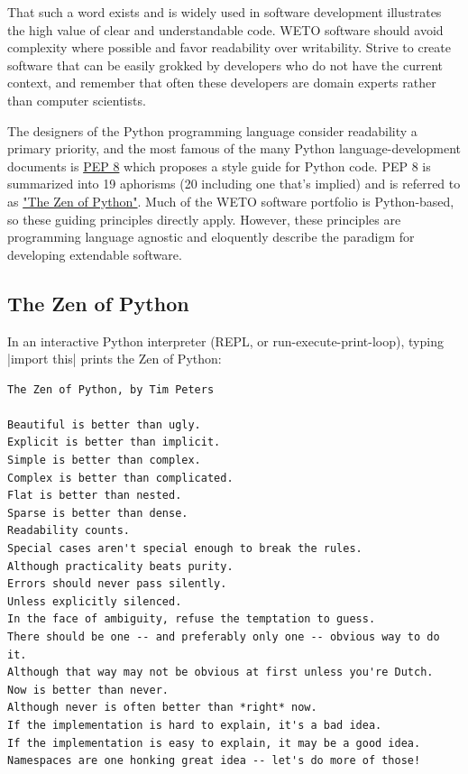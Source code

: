 \documentclass[]{nlr}
\begin{document}
That such a word exists and is widely used in software development illustrates the high value
of clear and understandable code.
WETO software should avoid complexity where possible and favor readability over writability.
Strive to create software that can be easily grokked by developers who do not have the current
context, and remember that often these developers are domain experts rather than
computer scientists.

The designers of the Python programming language consider readability a primary priority, and
the most famous of the many Python language-development documents is
\href{https://peps.python.org/pep-0008/}{PEP 8} which proposes a style guide for Python code.
PEP 8 is summarized into 19 aphorisms (20 including one that’s implied) and is referred to as
\href{https://peps.python.org/pep-0020/}{"The Zen of Python"}. Much of the WETO software portfolio is
Python-based, so these guiding principles directly apply. However, these principles are
programming language agnostic and eloquently describe the paradigm for developing
extendable software.


\subsection{The Zen of Python}
\label{sec:zen}

In an interactive Python interpreter (REPL, or run-execute-print-loop), typing |import this| prints the Zen of Python:

\begin{lstlisting}
The Zen of Python, by Tim Peters

Beautiful is better than ugly.
Explicit is better than implicit.
Simple is better than complex.
Complex is better than complicated.
Flat is better than nested.
Sparse is better than dense.
Readability counts.
Special cases aren't special enough to break the rules.
Although practicality beats purity.
Errors should never pass silently.
Unless explicitly silenced.
In the face of ambiguity, refuse the temptation to guess.
There should be one -- and preferably only one -- obvious way to do it.
Although that way may not be obvious at first unless you're Dutch.
Now is better than never.
Although never is often better than *right* now.
If the implementation is hard to explain, it's a bad idea.
If the implementation is easy to explain, it may be a good idea.
Namespaces are one honking great idea -- let's do more of those!
\end{lstlisting}
\end{document}
